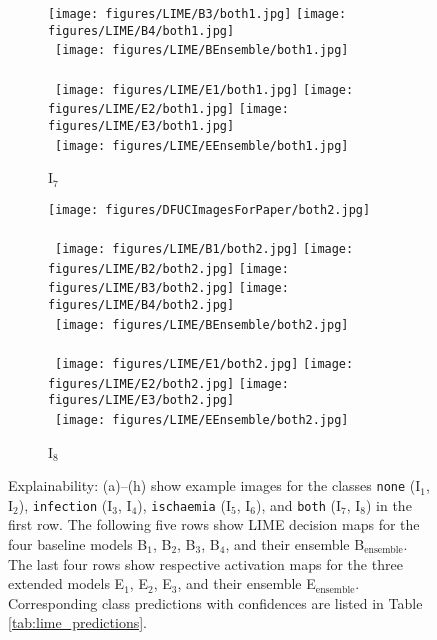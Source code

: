 \documentclass[runningheads]{llncs}
\begin{document}
\begin{figure}[ht!]
\begin{subfigure}[b]{0.10\textwidth}
        \texttt{[image: figures/LIME/B3/both1.jpg]} 
        \texttt{[image: figures/LIME/B4/both1.jpg]}\\\ 
        \texttt{[image: figures/LIME/BEnsemble/both1.jpg]}\\\ \\\ 
        \texttt{[image: figures/LIME/E1/both1.jpg]} 
        \texttt{[image: figures/LIME/E2/both1.jpg]} 
        \texttt{[image: figures/LIME/E3/both1.jpg]}\\\ 
        \texttt{[image: figures/LIME/EEnsemble/both1.jpg]}
        \caption{I$_7$}
        \label{fig:lime_i7}
    \end{subfigure}
    \hfill
    \begin{subfigure}[b]{0.10\textwidth}
        \centering
        \texttt{[image: figures/DFUCImagesForPaper/both2.jpg]}\\\ \\\ 
        \texttt{[image: figures/LIME/B1/both2.jpg]} 
        \texttt{[image: figures/LIME/B2/both2.jpg]} 
        \texttt{[image: figures/LIME/B3/both2.jpg]} 
        \texttt{[image: figures/LIME/B4/both2.jpg]}\\\ 
        \texttt{[image: figures/LIME/BEnsemble/both2.jpg]}\\\ \\\ 
        \texttt{[image: figures/LIME/E1/both2.jpg]} 
        \texttt{[image: figures/LIME/E2/both2.jpg]} 
        \texttt{[image: figures/LIME/E3/both2.jpg]}\\\ 
        \texttt{[image: figures/LIME/EEnsemble/both2.jpg]}
        \caption{I$_8$}
        \label{fig:lime_i8}
    \end{subfigure}
    \caption{Explainability: (a)--(h) show example images for the classes \texttt{none} (I$_1$, I$_2$), \texttt{infection} (I$_3$, I$_4$), \texttt{ischaemia} (I$_5$, I$_6$), and \texttt{both} (I$_7$, I$_8$) in the first row. The following five rows show LIME decision maps for the four baseline models B$_1$, B$_2$, B$_3$, B$_4$, and their ensemble B$_\text{ensemble}$. The last four rows show respective activation maps for the three extended models E$_1$, E$_2$, E$_3$, and their ensemble E$_\text{ensemble}$. Corresponding class predictions with confidences are listed in Table \ref{tab:lime_predictions}.}
    \label{fig:lime}
\end{figure}
\end{document}
